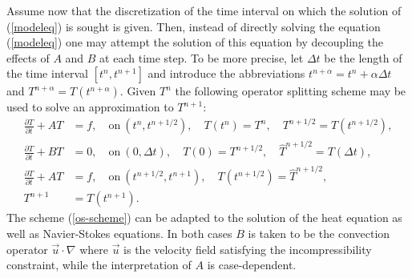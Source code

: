 Assume now that the discretization of the time interval on which the solution 
of (\ref{modeleq}) is sought is given. Then,
instead of directly solving the equation (\ref{modeleq}) one 
may attempt the solution of this equation by decoupling the effects of $A$ and 
$B$ at each time step. To be more precise, let $\Delta t$ be the length of the
time interval $[t^n,t^{n+1}]$ and introduce the abbreviations 
$t^{n+\alpha}=t^n + \alpha\Delta t$ and $T^{n+\alpha}=T(t^{n+\alpha})$. 
Given $T^n$ the following operator splitting scheme may be used to solve
an approximation to $T^{n+1}$:    
\begin{equation}\label{os-scheme}
\begin{split}
\frac{\partial T}{\partial t}+A T &= f,\quad \mathrm{on}\ (t^n,t^{n+1/2}),
\quad T(t^n)=T^n, \quad T^{n+1/2}=T(t^{n+1/2}), \\
\frac{\partial T}{\partial t}+B T &= 0,\quad \mathrm{on}\ (0,\Delta t),
\quad T(0)=T^{n+1/2}, \quad \hat{T}^{n+1/2}=T(\Delta t),  \\ 
\frac{\partial T}{\partial t}+A T &= f,\quad \mathrm{on}\ (t^{n+1/2},t^{n+1}),
\quad T(t^{n+1/2})=\hat{T}^{n+1/2},\\
T^{n+1}&=T(t^{n+1}).
\end{split}
\end{equation}
The scheme (\ref{os-scheme}) can be adapted to the solution of the heat 
equation as well as Navier-Stokes equations. In both cases $B$ is taken
to be the convection operator $\vec u \cdot \nabla$ where $\vec u$  
is the velocity field satisfying the incompressibility constraint, while
the interpretation of $A$ is case-dependent. 

